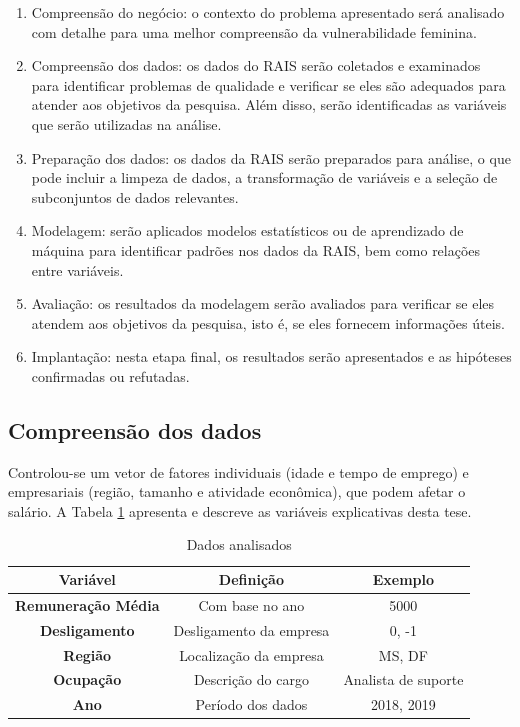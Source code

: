 \begin{enumerate}
	\item Compreensão do negócio: o contexto do problema apresentado será analisado com detalhe para uma melhor compreensão da vulnerabilidade feminina.
	\item Compreensão dos dados: os dados do RAIS serão coletados e examinados para identificar problemas de qualidade e verificar se eles são adequados para atender aos objetivos da pesquisa. Além disso, serão identificadas as variáveis que serão utilizadas na análise.
	\item Preparação dos dados: os dados da RAIS serão preparados para análise, o que pode incluir a limpeza de dados, a transformação de variáveis e a seleção de subconjuntos de dados relevantes. 
	\item Modelagem: serão aplicados modelos estatísticos ou de aprendizado de máquina para identificar padrões nos dados da RAIS, bem como relações entre variáveis.
	\item Avaliação: os resultados da modelagem serão avaliados para verificar se eles atendem aos objetivos da pesquisa, isto é, se eles fornecem informações úteis.
	\item Implantação: nesta etapa final, os resultados serão apresentados e as hipóteses confirmadas ou refutadas.     	      	      	      	      	      
\end{enumerate}


\subsection{Compreensão dos dados}

Controlou-se um vetor de fatores individuais (idade e tempo de emprego) e empresariais
(região, tamanho e atividade econômica), que podem afetar o salário. A Tabela \ref{vars} apresenta e
descreve as variáveis explicativas desta tese.

\begin{table}[htbp]
	\caption{Dados analisados}
	\begin{center}
		\begin{tabular}{|c|c|c|}
			\hline
			\textbf{Variável}            & \textbf{Definição}     & \textbf{Exemplo}    \\ 
			\hline 
			\textbf{Remuneração Média} & Com base no ano          & 5000                \\
			\hline
			\textbf{Desligamento}         & Desligamento da empresa  & 0, -1               \\
			\hline 
			\textbf{Região}              & Localização da empresa & MS, DF              \\
			\hline 
			\textbf{Ocupação}           & Descrição do cargo     & Analista de suporte \\
			\hline 
			\textbf{Ano}                  & Período dos dados       & 2018, 2019          \\
			\hline
		\end{tabular}
		\label{vars}
	\end{center}
\end{table}

